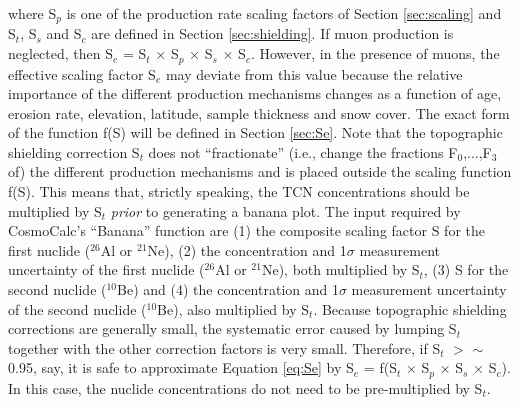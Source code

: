 \documentclass{article}
\begin{document}
where S$_p$ is  one of the production rate  scaling factors of Section
\ref{sec:scaling} and  S$_t$, S$_s$ and  S$_c$ are defined  in Section
\ref{sec:shielding}.  If  muon production  is neglected, then  S$_e$ =
S$_t$ $\times$  S$_p$ $\times$ S$_s$  $\times$ S$_c$. However,  in the
presence of muons, the effective scaling factor S$_e$ may deviate from
this value because the relative importance of the different production
mechanisms  changes as  a function  of age,  erosion  rate, elevation,
latitude,  sample thickness  and snow  cover.  The  exact form  of the
function f(S) will be defined  in Section \ref{sec:Se}.  Note that the
topographic shielding correction S$_t$ does not ``fractionate'' (i.e.,
change  the  fractions F$_0$,...,F$_3$  of)  the different  production
mechanisms  and is  placed outside  the scaling  function  f(S).  This
means  that,  strictly  speaking,  the TCN  concentrations  should  be
multiplied  by S$_t$  {\it prior}  to generating  a banana  plot.  The
input  required  by  CosmoCalc's   ``Banana''  function  are  (1)  the
composite  scaling  factor  S  for  the first  nuclide  ($^{26}$Al  or
$^{21}$Ne),   (2)   the   concentration  and   1$\sigma$   measurement
uncertainty  of  the  first  nuclide ($^{26}$Al  or  $^{21}$Ne),  both
multiplied by S$_t$, (3) S  for the second nuclide ($^{10}$Be) and (4)
the concentration and 1$\sigma$  measurement uncertainty of the second
nuclide  ($^{10}$Be), also multiplied  by S$_t$.   Because topographic
shielding corrections are generally small, the systematic error caused
by lumping  S$_t$ together with  the other correction factors  is very
small.   Therefore, if  S$_t$  $>$ $\sim$  0.95,  say, it  is safe  to
approximate  Equation \ref{eq:Se}  by S$_e$  = f(S$_t$  $\times$ S$_p$
$\times$   S$_s$  $\times$   S$_c$).   In   this  case,   the  nuclide
concentrations do not need to be pre-multiplied by S$_t$.
\\
\end{document}
